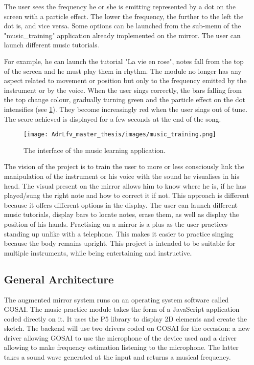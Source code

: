 The user sees the frequency he or she is emitting represented by a dot on the screen with a particle effect. The lower the frequency, the further to the left the dot is, and vice versa. Some options can be launched from the sub-menu of the "music\_training" application already
implemented on the mirror. The user can launch different music tutorials.

For example, he can launch the tutorial "La vie en rose", notes fall from the top of the screen and he must play them in rhythm. The module no longer has any aspect related to movement or position but only to the frequency emitted by the instrument or by the voice.
When the user sings correctly, the bars falling from the top change colour, gradually turning green and the particle effect on the dot intensifies (see \ref{fig:music_training}). They become increasingly red when the user sings out of tune. The score achieved is displayed for a few seconds at the end of the song.

\begin{figure}[h]
    \centering
    \texttt{[image: AdrLfv\_master\_thesis/images/music\_training.png]}
    \caption{The interface of the music learning application.}
    \label{fig:music_training}
\end{figure}

The vision of the project is to train the user to more or less consciously link the manipulation of the instrument or his voice with the sound he visualises in his head. The visual present on the mirror allows him to know where he is, if he has played/sung the right note and how to correct it if not.
This approach is different because it offers different options in the display. The user can launch different music tutorials, display bars to locate notes, erase them, as well as display the position of his hands.
Practising on a mirror is a plus as the user practices standing up unlike with a telephone. This makes it easier to practice singing because the body remains upright. This project is intended to be suitable for multiple instruments, while being entertaining and instructive.

\subsection{General Architecture}

The augmented mirror system runs on an operating system software called GOSAI. The music practice module takes the form of a JavaScript application coded directly on it. It uses the P5 library to display 2D elements and create the sketch. The backend will use two drivers coded on GOSAI for the occasion: a new driver allowing GOSAI to use the microphone of the device used and a driver allowing to make frequency estimation listening to the microphone. The latter takes a sound wave generated at the input and returns a musical frequency.


